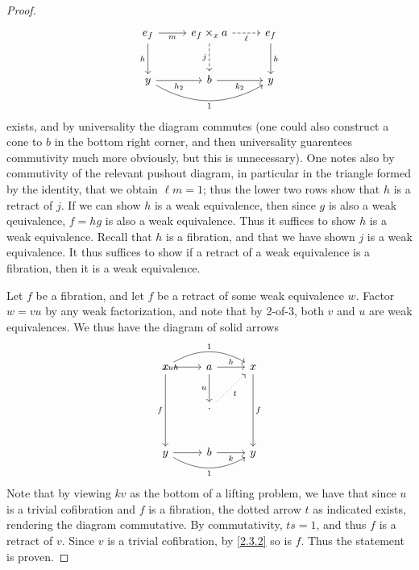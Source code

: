 \begin{proof}
\[\begin{tikzcd}[row sep = 2.5em, column sep = 2.5em]
	e_f \ar[" h "', d] \ar[" m "', r]  & e_f \times_xa \ar[dashed, " j "', d] \ar[" \ell  "', dashed, r] & e_f \ar[" h ", d]  \\
	y \ar[" 1 "', bend right, rr] \ar[" h_2 "', r]  & b \ar[" k_2 "', r]  & y
	\end{tikzcd}\]
	exists, and by universality the diagram commutes (one could also construct a cone to $b$ in the bottom right corner, and then universality guarentees commutivity much more obviously, but this is unnecessary). One notes also by commutivity of the relevant pushout diagram, in particular in the triangle formed by the identity, that we obtain $\ell m=1$; thus the lower two rows show that $h$ is a retract of $j$. If we can show $h$ is a weak equivalence, then since $g$ is also a weak qeuivalence, $f=hg$ is also a weak equivalence. Thus it suffices to show $h$ is a weak equivalence. Recall that $h$ is a fibration, and that we have shown $j$ is a weak equivalence. It thus suffices to show if a retract of a weak equivalence is a fibration, then it is a weak equivalence.

	Let $f$ be a fibration, and let $f$ be a retract of some weak equivalence $w$. Factor $w=vu$ by any weak factorization, and note that by 2-of-3, both $v$ and $u$ are weak equivalences. We thus have the diagram of solid arrows
	\[\begin{tikzcd}[row sep = 2.5em, column sep = 2.5em]
	x \ar[" 1 ", bend left, rr] \ar[" f "', dd] \ar[r] \ar[" uh "', ]  & a \ar[" u "', d] \ar[" h ", r]  & x \ar[" f ", dd]  \\
	 & \cdot \ar[" t "', dotted, ur]  &  \\
	y \ar[r] \ar[" 1 "', bend right, rr]  & b \ar[" k "', r]  & y
	\end{tikzcd}\]
	Note that by viewing $kv$ as the bottom of a lifting problem, we have that since $u$ is a trivial cofibration and $f$ is a fibration, the dotted arrow $t$ as indicated exists, rendering the diagram commutative. By commutativity, $ts=1$, and thus $f$ is a retract of $v$. Since $v$ is a trivial cofibration, by \cref{2.3.2} so is $f$. Thus the statement is proven.
\end{proof}

